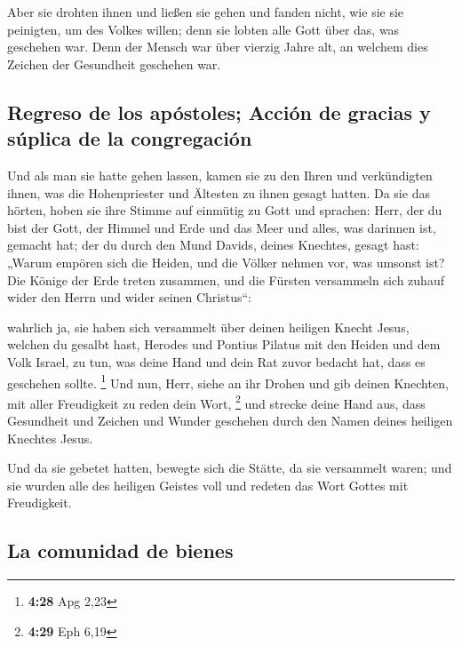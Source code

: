  Aber sie drohten ihnen und ließen sie gehen und fanden
nicht, wie sie sie peinigten, um des Volkes willen; denn sie lobten alle
Gott über das, was geschehen war.  Denn der Mensch war
über vierzig Jahre alt, an welchem dies Zeichen der Gesundheit geschehen
war.

\hypertarget{regreso-de-los-apuxf3stoles-acciuxf3n-de-gracias-y-suxfaplica-de-la-congregaciuxf3n}{%
\subsection{Regreso de los apóstoles; Acción de gracias y súplica de la
congregación}\label{regreso-de-los-apuxf3stoles-acciuxf3n-de-gracias-y-suxfaplica-de-la-congregaciuxf3n}}

 Und als man sie hatte gehen lassen, kamen sie zu den
Ihren und verkündigten ihnen, was die Hohenpriester und Ältesten zu
ihnen gesagt hatten.  Da sie das hörten, hoben sie ihre
Stimme auf einmütig zu Gott und sprachen: Herr, der du bist der Gott,
der Himmel und Erde und das Meer und alles, was darinnen ist, gemacht
hat;  der du durch den Mund Davids, deines Knechtes,
gesagt hast: „Warum empören sich die Heiden, und die Völker nehmen vor,
was umsonst ist?  Die Könige der Erde treten zusammen,
und die Fürsten versammeln sich zuhauf wider den Herrn und wider seinen
Christus``:

 wahrlich ja, sie haben sich versammelt über deinen
heiligen Knecht Jesus, welchen du gesalbt hast, Herodes und Pontius
Pilatus mit den Heiden und dem Volk Israel,  zu tun, was
deine Hand und dein Rat zuvor bedacht hat, dass es geschehen sollte.
\footnote{\textbf{4:28} Apg 2,23}  Und nun, Herr, siehe
an ihr Drohen und gib deinen Knechten, mit aller Freudigkeit zu reden
dein Wort, \footnote{\textbf{4:29} Eph 6,19}  und strecke
deine Hand aus, dass Gesundheit und Zeichen und Wunder geschehen durch
den Namen deines heiligen Knechtes Jesus.

 Und da sie gebetet hatten, bewegte sich die Stätte, da
sie versammelt waren; und sie wurden alle des heiligen Geistes voll und
redeten das Wort Gottes mit Freudigkeit.

\hypertarget{la-comunidad-de-bienes}{%
\subsection{La comunidad de bienes}\label{la-comunidad-de-bienes}}


